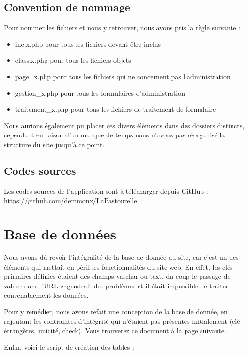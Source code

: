 \documentclass[11pt]{report}
\begin{document}
\subsection{Convention de nommage}
Pour nommer les fichiers et nous y retrouver, nous avons pris la règle suivante
: 
\begin{itemize}
\item inc.x.php pour tous les fichiers devant être inclus
\item class.x.php pour tous les fichiers objets
\item page\_x.php pour tous les fichiers qui ne concernent pas
l’administration
\item gestion\_x.php pour tous les formulaires d'administration
\item traitement\_x.php pour tous les fichiers de traitement de formulaire \\
\end{itemize}

\par Nous aurions également pu placer ces divers éléments dans des dossiers
distincts, cependant en raison d'un manque de temps nous n'avons pas réorganisé
la structure du site jusqu'à ce point.

\subsection{Codes sources}
Les codes sources de l'application sont à télécharger depuis GitHub :
https://github.com/demmonx/LaPastourelle

\section{Base de données}
Nous avons dû revoir l'intégralité de la base de donnée du site, car c'est un
des éléments qui mettait en péril les fonctionnalités du site web. En effet, les
clés primaires définies étaient des champs varchar ou text, du coup le passage 
de valeur dans l'URL engendrait des problèmes et il était impossible de traiter
convenablement les données. \\

\par Pour y remédier, nous avons refait une conception de la base de donnée, en
rajoutant les contraintes d'intégrité qui n'étaient pas présentes initialement
(clé étrangères, unicité, check). Vous trouverez ce document à la page suivante.




\begin{multicols}{2}

\par Enfin, voici le script de création des tables :\\

        \end{multicols}
        
\end{document}
